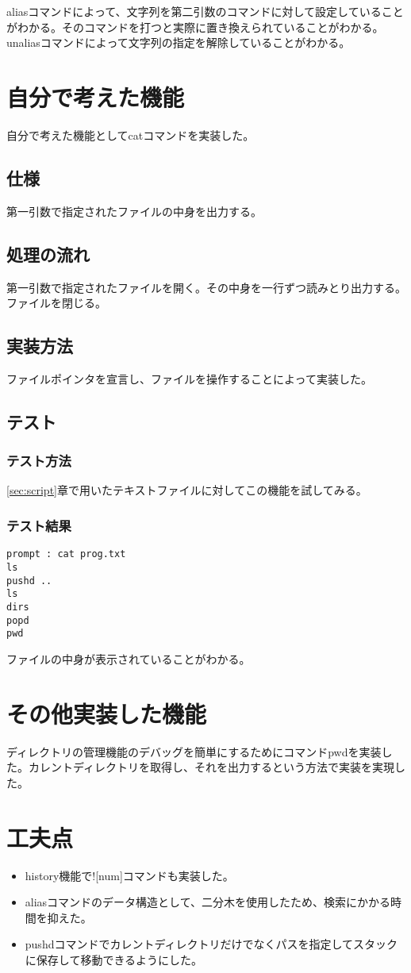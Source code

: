 \documentclass{procreport}
\begin{document}
aliasコマンドによって、文字列を第二引数のコマンドに対して設定していることがわかる。そのコマンドを打つと実際に置き換えられていることがわかる。unaliasコマンドによって文字列の指定を解除していることがわかる。

\section{自分で考えた機能}
自分で考えた機能としてcatコマンドを実装した。
\subsection{仕様}
第一引数で指定されたファイルの中身を出力する。
\subsection{処理の流れ}
第一引数で指定されたファイルを開く。その中身を一行ずつ読みとり出力する。ファイルを閉じる。
\subsection{実装方法}
ファイルポインタを宣言し、ファイルを操作することによって実装した。
\subsection{テスト}
\subsubsection{テスト方法}
\ref{sec:script}章で用いたテキストファイルに対してこの機能を試してみる。
\subsubsection{テスト結果}
\begin{screen}
\begin{verbatim}
prompt : cat prog.txt
ls
pushd ..
ls
dirs
popd
pwd
\end{verbatim}
\end{screen}
ファイルの中身が表示されていることがわかる。

\section{その他実装した機能}
ディレクトリの管理機能のデバッグを簡単にするためにコマンドpwdを実装した。カレントディレクトリを取得し、それを出力するという方法で実装を実現した。


\section{工夫点}
\begin{itemize}
\item history機能で![num]コマンドも実装した。
\item aliasコマンドのデータ構造として、二分木を使用したため、検索にかかる時間を抑えた。
\item pushdコマンドでカレントディレクトリだけでなくパスを指定してスタックに保存して移動できるようにした。
\end{itemize}
\end{document}
